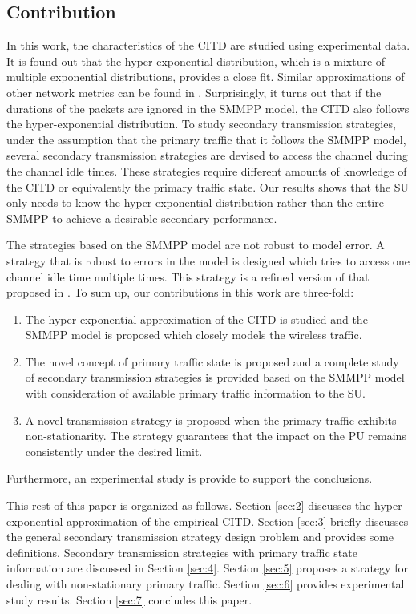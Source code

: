 \documentclass[10pt,final,journal,letterpaper]{IEEEtran}
\begin{document}
\subsection{Contribution}
In this work, the characteristics of the CITD are studied using experimental data. It is found out that the hyper-exponential distribution, which is a mixture of multiple exponential distributions, provides a close fit. Similar approximations of other network metrics can be found in \cite{feldmann1998fitting}. Surprisingly, it turns out that if the durations of the packets are ignored in the SMMPP model, the CITD also follows the hyper-exponential distribution. To study secondary transmission strategies, under the assumption that the primary traffic that it follows the SMMPP model, several secondary transmission strategies are devised to access the channel during the channel idle times. These strategies require different amounts of knowledge of the CITD or equivalently the primary traffic state. Our results shows that the SU only needs to know the hyper-exponential distribution rather than the entire SMMPP to achieve a desirable secondary performance.

\par
The strategies based on the SMMPP model are not robust to model error. A strategy that is robust to errors in the model is designed which tries to access one channel idle time multiple times. This strategy is a refined version of that proposed in \cite{liu2010novel, liuhyperexponential}. To sum up, our contributions in this work are three-fold:
\begin{enumerate}
  \item The hyper-exponential approximation of the CITD is studied and the SMMPP model is proposed which closely models the wireless traffic.
  \item The novel concept of primary traffic state is proposed and a complete study of secondary transmission strategies is provided based on the SMMPP model with consideration of available primary traffic information to the SU.
  \item A novel transmission strategy is proposed when the primary traffic exhibits non-stationarity. The strategy guarantees that the impact on the PU remains consistently under the desired limit.
\end{enumerate}
Furthermore, an experimental study is provide to support the conclusions.

\par
This rest of this paper is organized as follows. Section \ref{sec:2} discusses the hyper-exponential approximation of the empirical CITD. Section \ref{sec:3} briefly discusses the general secondary transmission strategy design problem and provides some definitions. Secondary transmission strategies with primary traffic state information are discussed in Section \ref{sec:4}. Section \ref{sec:5} proposes a strategy for dealing with non-stationary primary traffic. Section \ref{sec:6} provides experimental study results. Section \ref{sec:7} concludes this paper.
\end{document}
